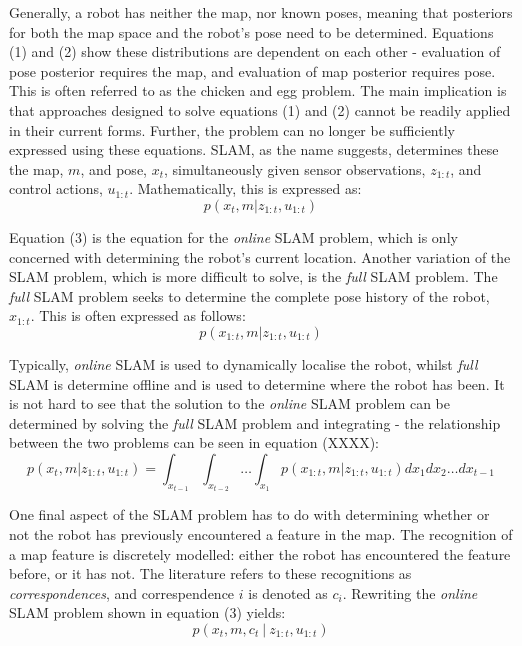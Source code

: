 \documentclass[a4paper]{article}
\begin{document}
Generally, a robot has neither the map, nor known poses, meaning that posteriors for both the map space and the robot's pose need to be determined. Equations (1) and (2) show these distributions are dependent on each other - evaluation of pose posterior requires the map, and evaluation of map posterior requires pose. This is often referred to as the chicken and egg problem. The main implication is that approaches designed to solve equations (1) and (2) cannot be readily applied in their current forms. Further, the problem can no longer be sufficiently expressed using these equations. SLAM, as the name suggests, determines these the map, $m$, and pose, $x_t$, simultaneously given sensor observations, $z_{1:t}$, and control actions, $u_{1:t}$. Mathematically, this is expressed as:
\begin{equation}
p(x_t, m | z_{1:t}, u_{1:t})
\end{equation}

Equation (3) is the equation for the \textit{online} SLAM problem, which is only concerned with determining the robot's current location. Another variation of the SLAM problem, which is more difficult to solve, is the \textit{full} SLAM problem. The \textit{full} SLAM problem seeks to determine the complete pose history of the robot, $x_{1:t}$. This is often expressed as follows:
\begin{equation}
p(x_{1:t}, m | z_{1:t}, u_{1:t})
\end{equation}

Typically, \textit{online} SLAM is used to dynamically localise the robot, whilst \textit{full} SLAM is determine offline and is used to determine where the robot has been. It is not hard to see that the solution to the \textit{online} SLAM problem can be determined by solving the \textit{full} SLAM problem and integrating - the relationship between the two problems can be seen in equation (XXXX):
\begin{equation}
p(x_t, m | z_{1:t}, u_{1:t}) = \int_{x_{t-1}} \int_{x_{t-2}} \dots \int_{x_1} p(x_{1:t}, m | z_{1:t}, u_{1:t}) dx_1 dx_2 \dots dx_{t-1}
\end{equation}

One final aspect of the SLAM problem has to do with determining whether or not the robot has previously encountered a feature in the map. The recognition of a map feature is discretely modelled: either the robot has encountered the feature before, or it has not. The literature refers to these recognitions as \textit{correspondences}, and correspendence $i$ is denoted as $c_i$. Rewriting the \textit{online} SLAM problem shown in equation (3) yields:
\begin{equation}
p(x_t, m, c_t \ | \ z_{1:t}, u_{1:t})
\end{equation}
\end{document}
